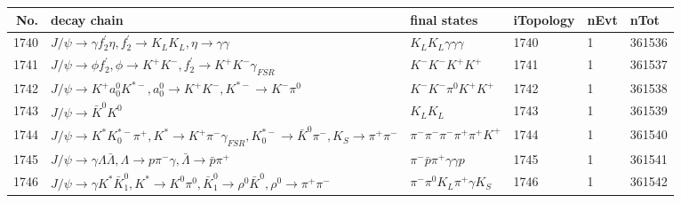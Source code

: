 \begin{table}[htbp] 
\begin{center}
\begin{small}
\begin{tabular}{rlllll}\hline\hline
 No. & decay chain & final states &  iTopology & nEvt & nTot \\\hline
1740&$J/\psi       \rightarrow \gamma       f_2^{'}       \eta          , f_2^{'}        \rightarrow K_{L}          K_{L}          , \eta           \rightarrow \gamma       \gamma       $&$K_{L}          K_{L}          \gamma       \gamma       \gamma       $& 1740&    1&361536\\
1741&$J/\psi       \rightarrow \phi           f_2^{'}       , \phi            \rightarrow K^{+}          K^{-}          , f_2^{'}        \rightarrow K^{+}          K^{-}          \gamma_{FSR} $&$K^{-}          K^{-}          K^{+}          K^{+}          $& 1741&    1&361537\\
1742&$J/\psi       \rightarrow K^{+}          a_{0}^{0}      K^{*-}         , a_{0}^{0}       \rightarrow K^{+}          K^{-}          , K^{*-}          \rightarrow K^{-}          \pi^{0}        $&$K^{-}          K^{-}          \pi^{0}        K^{+}          K^{+}          $& 1742&    1&361538\\
1743&$J/\psi       \rightarrow \bar{K}^{0}   K^{0}          $&$K_{L}          K_{L}          $& 1743&    1&361539\\
1744&$J/\psi       \rightarrow K^{*}          K_{0}^{*-}     \pi^{+}        , K^{*}           \rightarrow K^{+}          \pi^{-}        \gamma_{FSR} , K_{0}^{*-}      \rightarrow \bar{K}^{0}   \pi^{-}        , K_{S}           \rightarrow \pi^{+}        \pi^{-}        $&$\pi^{-}        \pi^{-}        \pi^{-}        \pi^{+}        \pi^{+}        K^{+}          $& 1744&    1&361540\\
1745&$J/\psi       \rightarrow \gamma       \Lambda           \bar{\Lambda}    , \Lambda            \rightarrow p                 \pi^{-}        \gamma       , \bar{\Lambda}     \rightarrow \bar{p}          \pi^{+}        $&$\pi^{-}        \bar{p}          \pi^{+}        \gamma       \gamma       p                 $& 1745&    1&361541\\
1746&$J/\psi       \rightarrow \gamma       K^{*}          \bar{K}_1^{0} , K^{*}           \rightarrow K^{0}          \pi^{0}        , \bar{K}_1^{0}  \rightarrow \rho^{0}      \bar{K}^{0}   , \rho^{0}       \rightarrow \pi^{+}        \pi^{-}        $&$\pi^{-}        \pi^{0}        K_{L}          \pi^{+}        \gamma       K_{S}          $& 1746&    1&361542\\

\end{tabular}
\end{small}
\end{center}
\end{table}
